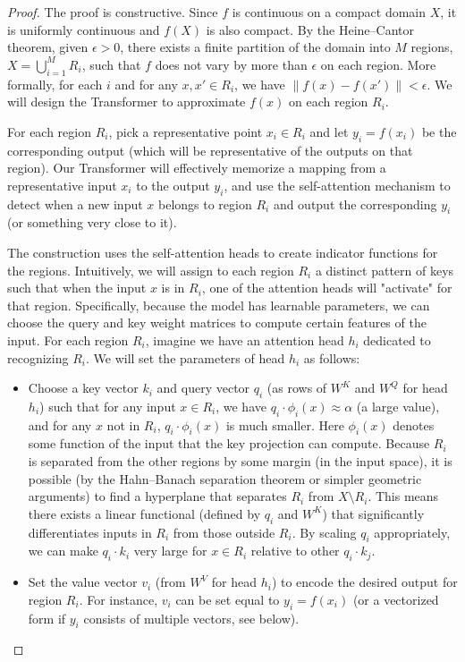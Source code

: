 \documentclass[conference]{IEEEtran}
\begin{document}
\begin{proof}
The proof is constructive. Since $f$ is continuous on a compact domain $X$, it is uniformly continuous and $f(X)$ is also compact. By the Heine--Cantor theorem, given $\epsilon > 0$, there exists a finite partition of the domain into $M$ regions, $X = \bigcup_{i=1}^{M} R_i$, such that $f$ does not vary by more than $\epsilon$ on each region. More formally, for each $i$ and for any $x, x' \in R_i$, we have $\|f(x) - f(x')\| < \epsilon$. We will design the Transformer to approximate $f(x)$ on each region $R_i$.

For each region $R_i$, pick a representative point $x_i \in R_i$ and let $y_i = f(x_i)$ be the corresponding output (which will be representative of the outputs on that region). Our Transformer will effectively memorize a mapping from a representative input $x_i$ to the output $y_i$, and use the self-attention mechanism to detect when a new input $x$ belongs to region $R_i$ and output the corresponding $y_i$ (or something very close to it).

The construction uses the self-attention heads to create indicator functions for the regions. Intuitively, we will assign to each region $R_i$ a distinct pattern of keys such that when the input $x$ is in $R_i$, one of the attention heads will "activate" for that region. Specifically, because the model has learnable parameters, we can choose the query and key weight matrices to compute certain features of the input. For each region $R_i$, imagine we have an attention head $h_i$ dedicated to recognizing $R_i$. We will set the parameters of head $h_i$ as follows:
\begin{itemize}
    \item Choose a key vector $k_i$ and query vector $q_i$ (as rows of $W^K$ and $W^Q$ for head $h_i$) such that for any input $x \in R_i$, we have $q_i \cdot \phi_i(x) \approx \alpha$ (a large value), and for any $x$ not in $R_i$, $q_i \cdot \phi_i(x)$ is much smaller. Here $\phi_i(x)$ denotes some function of the input that the key projection can compute. Because $R_i$ is separated from the other regions by some margin (in the input space), it is possible (by the Hahn--Banach separation theorem or simpler geometric arguments) to find a hyperplane that separates $R_i$ from $X \setminus R_i$. This means there exists a linear functional (defined by $q_i$ and $W^K$) that significantly differentiates inputs in $R_i$ from those outside $R_i$. By scaling $q_i$ appropriately, we can make $q_i \cdot k_i$ very large for $x \in R_i$ relative to other $q_i \cdot k_j$.
    \item Set the value vector $v_i$ (from $W^V$ for head $h_i$) to encode the desired output for region $R_i$. For instance, $v_i$ can be set equal to $y_i = f(x_i)$ (or a vectorized form if $y_i$ consists of multiple vectors, see below).
\end{itemize}


\end{proof}
\end{document}
